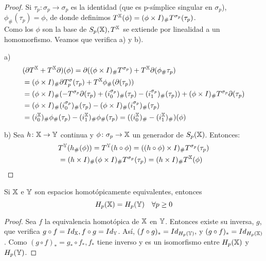 \begin{proof}
  Si $\tau_p \colon \sigma_p \to \sigma_p$ es la identidad (que es p-símplice singular en $\sigma_p$), $\phi_\#(\tau_p) = \phi$,
  de donde definimos $T^{\mathbb X}(\phi) = (\phi \times I)_\# T^{\sigma_p}(\tau_p)$. \\
  Como los $\phi$ son la base de $S_{p}({\mathbb X}), T^{\mathbb X}$ se extiende por linealidad a un homomorfismo. Veamos que verifica a) y b).

  a)
  \begin{align*}
    &(\partial T^{\mathbb X} + T^{\mathbb X} \partial)(\phi) = \partial((\phi \times I)_\# T^{\sigma_p}) + T^{\mathbb X} \partial(\phi_\# \tau_p) \\
    &= (\phi \times I)_\# \partial T^\sigma_p(\tau_p) + T^{\mathbb X} \phi_\#(\partial(\tau_p)) \\
    &= (\phi \times I)_\# (- T^{\sigma_p} \partial(\tau_p) + (i_0^{\sigma_p})_\# (\tau_p) - (i_1^{\sigma_p})_\# (\tau_p)) + (\phi \times I)_\# T^{\sigma_p}\partial(\tau_p) \\
    &= (\phi \times I)_\# (i_0^{\sigma_p})_\#(\tau_p) - (\phi \times I)_\# (i_1^{\sigma_p})_\#(\tau_p) \\
    &= (i_0^{\mathbb X})_\# \phi_\#(\tau_p) - (i_1^{\mathbb X})_\# \phi_\#(\tau_p) = ((i_0^{\mathbb X})_\# - (i_1^{\mathbb X})_\#) (\phi)
  \end{align*}

  b) Sea $h\colon {\mathbb X} \to {\mathbb Y}$ continua y $\phi \colon \sigma_p \to {\mathbb X}$ un generador de $S_{p}({\mathbb X})$. Entonces:
  \begin{align*}
    &T^{\mathbb Y}(h_\#(\phi)) = T^{\mathbb Y}(h \circ \phi) = ((h \circ \phi) \times I)_\# T^{\sigma_p}(\tau_p) \\
    &= (h \times I)_\# (\phi \times I)_\# T^{\sigma_p} (\tau_p) = (h \times I)_\# T^{\mathbb X}(\phi)
  \end{align*}
\end{proof}

\begin{corollary}
  Si ${\mathbb X}$ e ${\mathbb Y}$ son espacios homotópicamente equivalentes, entonces \[H_p({\mathbb X}) = H_p({\mathbb Y}) \quad \forall p \geq 0\]
\end{corollary}

\begin{proof}
  Sea $f$ la equivalencia homotópica de ${\mathbb X}$ en ${\mathbb Y}$. Entonces existe su inversa, $g$, que verifica $g \circ f = Id_{\mathbb X}, f \circ g = Id_{\mathbb Y}$.
  Así, $(f \circ g)_* = Id_{H_p({\mathbb Y})},$ y $(g \circ f)_* = Id_{H_p({\mathbb X})}$. Como $(g \circ f)_* = g_* \circ f_*, f_*$ tiene inverso y es un isomorfismo
  entre $H_p({\mathbb X})$ y $H_p({\mathbb Y})$.
\end{proof}

